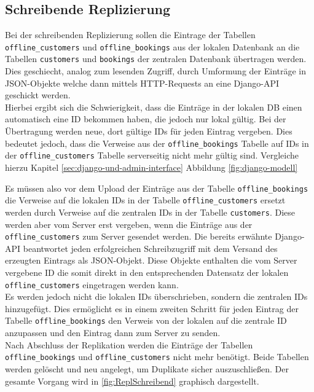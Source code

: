 \documentclass[12pt,a4paper,ngerman,english]{report}
\begin{document}
\subsection{Schreibende Replizierung}
\label{subsec:SchrRepl}

Bei der schreibenden Replizierung sollen die Eintrage der Tabellen \texttt{offline\_customers} und \texttt{offline\_bookings} aus der lokalen Datenbank an die Tabellen \texttt{customers} und \texttt{bookings} der zentralen Datenbank übertragen werden. Dies geschiecht, analog zum lesenden Zugriff, durch Umformung der Einträge in JSON-Objekte welche dann mittels HTTP-Requests an eine Django-API geschickt werden.\\

Hierbei ergibt sich die Schwierigkeit, dass die Einträge in der lokalen DB einen automatisch eine ID bekommen haben, die jedoch nur lokal gültig. Bei der Übertragung werden neue, dort gültige IDs für jeden Eintrag vergeben. Dies bedeutet jedoch, dass die Verweise aus der \texttt{offline\_bookings} Tabelle auf IDs in der \texttt{offline\_customers} Tabelle serverseitig nicht mehr gültig sind. Vergleiche hierzu Kapitel \ref{sec:django-und-admin-interface} Abbildung \ref{fig:django-modell}

Es müssen also vor dem Upload der Einträge aus der Tabelle \texttt{offline\_bookings} die Verweise auf die lokalen IDs in der Tabelle \texttt{offline\_customers} ersetzt werden durch Verweise auf die zentralen IDs in der Tabelle \texttt{customers}. Diese werden aber vom Server erst vergeben, wenn die Einträge aus der \texttt{offline\_customers} zum Server gesendet werden. Die bereits erwähnte Django-API beantwortet jeden erfolgreichen Schreibzugriff mit dem Versand des erzeugten Eintrags als JSON-Objekt. Diese Objekte enthalten die vom Server vergebene ID die somit direkt in den entsprechenden Datensatz der lokalen \texttt{offline\_customers} eingetragen werden kann.\\

Es werden jedoch nicht die lokalen IDs überschrieben, sondern die zentralen IDs hinzugefügt. Dies ermöglicht es in einem zweiten Schritt für jeden Eintrag der Tabelle \texttt{offline\_bookings} den Verweis von der lokalen auf die zentrale ID anzupassen und den Eintrag dann zum Server zu senden.\\

Nach Abschluss der Replikation werden die Einträge der Tabellen \texttt{offline\_bookings} und \texttt{offline\_customers} nicht mehr benötigt. Beide Tabellen werden gelöscht und neu angelegt, um Duplikate sicher auszuschließen. Der gesamte Vorgang wird in \autoref{fig:ReplSchreibend} graphisch dargestellt.
\end{document}
